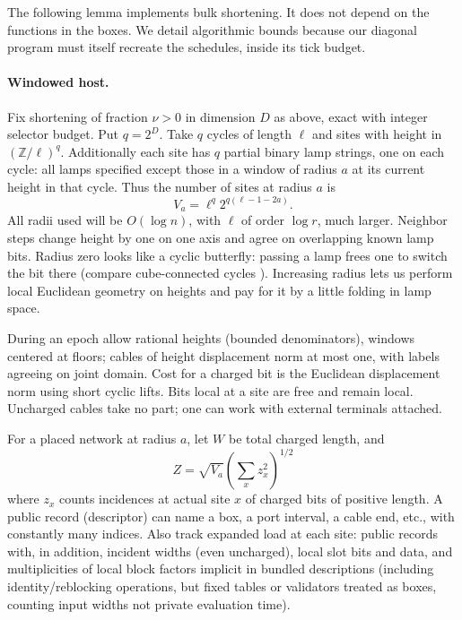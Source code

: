 \documentclass[11pt,letterpaper]{article}
\theoremstyle{definition}
\numberwithin{equation}{section}
\begin{document}
The following lemma implements bulk shortening. It does not depend on the functions in
the boxes. We detail algorithmic bounds because our diagonal program must itself recreate
the schedules, inside its tick budget.



\paragraph{Windowed host.}
Fix shortening of fraction $\nu >0$ in dimension $D$ as above, exact with
integer selector budget. Put $q=2^D$. Take $q$ cycles of length $\ell$ and sites with height in
$(\mathbb{Z}/\ell)^q$. Additionally each site has $q$ partial binary lamp strings, one on each cycle: all lamps
specified except those in a window of radius $a$ at its current height in that cycle. Thus the
number of sites at radius $a$ is
\[
  V_a= \ell^q2^{q(\ell-1-2a)}.
\]
All radii used will be $O(\log n)$, with $\ell$ of order $\log r$, much larger. Neighbor steps change
height by one on one axis and agree on overlapping known lamp bits. Radius zero looks like
a cyclic butterfly: passing a lamp frees one to switch the bit there (compare cube-connected
cycles \cite{PVCC}). Increasing radius lets us perform local Euclidean geometry on heights and pay
for it by a little folding in lamp space.

During an epoch allow rational heights (bounded denominators), windows centered at
floors; cables of height displacement norm at most one, with labels agreeing on joint domain.
Cost for a charged bit is the Euclidean displacement norm using short cyclic lifts. Bits
local at a site are free and remain local. Uncharged cables take no part; one can work with
external terminals attached.

For a placed network at radius $a$, let $W$ be total charged length, and
\[
  Z=\sqrt{V_a}\left(\sum_x z_x^2\right)^{1/2}
\]
where $z_x$ counts incidences at actual site $x$ of charged bits of positive length. A public record
(descriptor) can name a box, a port interval, a cable end, etc., with constantly many indices.
Also track expanded load at each site: public records with, in addition, incident widths
(even uncharged), local slot bits and data, and multiplicities of local block factors implicit in
bundled descriptions (including identity/reblocking operations, but fixed tables or validators
treated as boxes, counting input widths not private evaluation time).
\end{document}

